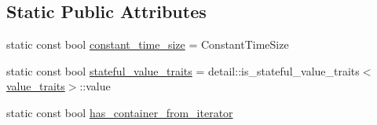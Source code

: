 \subsection*{Static Public Attributes}
\begin{DoxyCompactItemize}
\item 
static const bool \hyperlink{classboost_1_1intrusive_1_1list__impl_a874f994ae317f397c2d085b4bd046026}{constant\+\_\+time\+\_\+size} = Constant\+Time\+Size
\item 
static const bool \hyperlink{classboost_1_1intrusive_1_1list__impl_ab2af39c13da3c2bd169d47f39d501a26}{stateful\+\_\+value\+\_\+traits} = detail\+::is\+\_\+stateful\+\_\+value\+\_\+traits$<$\hyperlink{classboost_1_1intrusive_1_1list__impl_a5cd55672f6df367749d91ef708834126}{value\+\_\+traits}$>$\+::value
\item 
static const bool \hyperlink{classboost_1_1intrusive_1_1list__impl_acfc0b15fa95c54830808600dd25a7472}{has\+\_\+container\+\_\+from\+\_\+iterator}
\end{DoxyCompactItemize}
